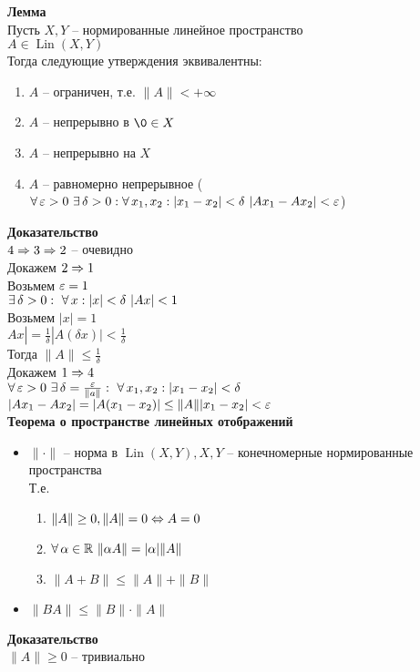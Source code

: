 \documentclass[12pt]{article}
\DeclareMathOperator{\Lin}{Lin}
\begin{document}
\textbf{Лемма}\\
Пусть $X, Y$ -- нормированные линейное пространство\\
$A \in \Lin(X, Y)$\\
Тогда следующие утверждения эквивалентны:
\begin{enumerate}
    \item $A$ -- ограничен, т.е. $\|A\| < +\infty$
    \item $A$ -- непрерывно в $\0 \in X$
    \item $A$ -- непрерывно на $X$
    \item $A$ -- равномерно непрерывное ($\fall \eps > 0\ \ex \delta > 0: \fall x_1, x_2: |x_1-x_2| < \delta\ |Ax_1 - Ax_2| < \eps$)
\end{enumerate}
\textbf{Доказательство}\\
$4 \Rightarrow 3 \Rightarrow 2$ -- очевидно\\
Докажем $2 \Rightarrow 1$\\
Возьмем $\varepsilon = 1$\\
$\ex \delta > 0:\ \fall x: |x| < \delta\ |Ax| < 1$\\
Возьмем $|x| = 1$\\
$Ax| = \frac1\delta|A(\delta x)| < \frac1\delta$\\
Тогда $\|A\| \leq \frac1\delta$\\
Докажем $1 \Rightarrow 4$\\
$\forall\, \varepsilon > 0\ \exists\, \delta = \frac{\varepsilon}{\|a\|}:\ \forall\, x_1, x_2: |x_1-x_2| < \delta$\\
$|Ax_1-Ax_2| = |A(x_1-x_2)| \leq \|A\||x_1-x_2| < \varepsilon$\\
\textbf{Теорема о пространстве линейных отображений}
\begin{itemize}
    \item $\|\cdot \|$ -- норма в $\Lin(X, Y), X, Y$ -- конечномерные нормированные пространства\\
    Т.е.\begin{enumerate}
        \item $\|A\| \geq 0, \|A\| = 0 \Leftrightarrow A = 0$
        \item $\forall\, \alpha \in \mathbb{R}\ \|\alpha A\| = |\alpha| \|A\|$
        \item $\|A + B\| \leq \|A\|+\|B\|$
    \end{enumerate}
    \item $\|BA\|\leq \|B\|\cdot\|A\|$
\end{itemize}
\textbf{Доказательство}\\
$\|A\| \geq 0$ -- тривиально\\
\end{document}
